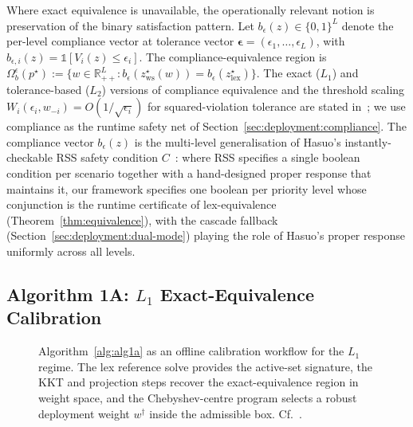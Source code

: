 Where exact equivalence is unavailable, the operationally relevant notion is preservation of the binary satisfaction pattern. Let $b_{\epsilon}(z) \in \{0, 1\}^{L}$ denote the per-level compliance vector at tolerance vector $\boldsymbol{\epsilon} = (\epsilon_1, \ldots, \epsilon_L)$, with $b_{\epsilon, i}(z) = \mathbb{1}[V_i(z) \leq \epsilon_i]$. The compliance-equivalence region is $\Omega_b^{\epsilon}(p^{\star}) := \{w \in \mathbb{R}_{++}^{L} : b_{\epsilon}(z_{\mathrm{ws}}^{\star}(w)) = b_{\epsilon}(z_{\mathrm{lex}}^{\star})\}$. The exact ($L_1$) and tolerance-based ($L_2$) versions of compliance equivalence and the threshold scaling $W_i(\epsilon_i, w_{-i}) = O(1/\sqrt{\epsilon_i})$ for squared-violation tolerance are stated in~\cite[\S7]{lcp2025}; we use compliance as the runtime safety net of Section~\ref{sec:deployment:compliance}. The compliance vector $b_{\epsilon}(z)$ is the multi-level generalisation of Hasuo's instantly-checkable RSS safety condition $C$~\cite[Def.~II.1, Req.~II.2]{hasuo2022rss}: where RSS specifies a single boolean condition per scenario together with a hand-designed proper response that maintains it, our framework specifies one boolean per priority level whose conjunction is the runtime certificate of lex-equivalence (Theorem~\ref{thm:equivalence}), with the cascade fallback (Section~\ref{sec:deployment:dual-mode}) playing the role of Hasuo's proper response uniformly across all levels.

\subsection{Algorithm 1A: $L_1$ Exact-Equivalence Calibration}
\label{sec:foundations:alg1a}

\begin{figure}[t]
    \centering
    
    \caption{Algorithm~\ref{alg:alg1a} as an offline calibration workflow for the $L_1$ regime. The lex reference solve provides the active-set signature, the KKT and projection steps recover the exact-equivalence region in weight space, and the Chebyshev-centre program selects a robust deployment weight $w^{\dagger}$ inside the admissible box. Cf.~\cite[Fig.~B1]{lcp2025}.}
    \label{fig:alg1a_flow}
\end{figure}

